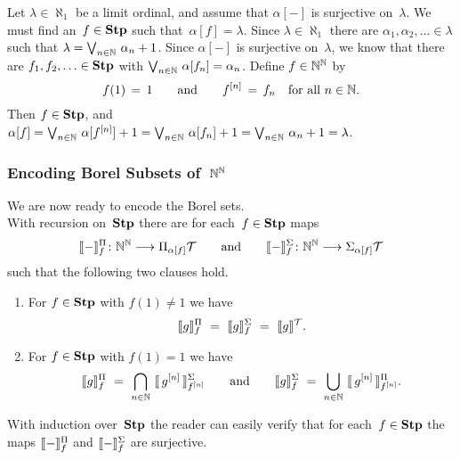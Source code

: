 \documentclass[main.tex]{subfiles}
\begin{document}
Let $\lambda\in\aleph_1$
be a limit ordinal,
and assume that $\alpha[-]$ is surjective on~$\lambda$.
We must find an~$f\in \mathbf{Stp}$ such that~$\alpha[f]=\lambda$.
Since $\lambda\in\aleph_1$
there are  $\alpha_1 ,\alpha_2 ,\dotsc \in \lambda$
such that $\lambda = \bv_{n\in\N}\ \alpha_n+1$.
Since $\alpha[-]$
is surjective on~$\lambda$,
we know that there are  $f_1,f_2,\dotsc \in \mathbf{Stp}$
with $\bv_{n\in\N} \ \alpha[f_n] = \alpha_n$.
Define $f\in\mathbb{N}^{\mathbb{N}}$ by 
\begin{equation*}
f(1)\,=\,1\qquad\text{and}\qquad
f^{[n]} \,=\, f_n\quad\text{for all $n\in\mathbb{N}$}.
\end{equation*}
Then $f\in\mathbf{Stp}$,
and $\alpha[f] = \textstyle{\bigvee}_{n\in\mathbb{N}}\  \alpha[f^{[n]}]+1 
= \textstyle{\bigvee}_{n\in\mathbb{N}}\ \alpha[f_n]+1
= \textstyle{\bigvee}_{n\in\mathbb{N}}\ \alpha_n +1 = \lambda$.

\subsubsection{Encoding Borel Subsets of~$\mathbb{N}^{\mathbb{N}}$}$\,$\\
We are now ready to encode the Borel sets.\\
With recursion on~$\mathbf{Stp}$
there are for each~$f\in\mathbf{Stp}$
maps
\begin{equation*}
\decode{-}^\Pi_f \colon \N^\N \longrightarrow \Pi_{\alpha[f]}\mathcal{T}
\qquad
\text{and}
\qquad
\decode{-}^\Sigma_f \colon \N^\N 
\longrightarrow \Sigma_{\alpha[f]}\mathcal{T}
\end{equation*}
such that the following two clauses hold.
\begin{enumerate}
\item
For $f\in \mathbf{Stp}$ with $f(1)\neq 1$ we have
\begin{equation*}
\decode{g}^\Pi_f \ =\  \decode{g}^\Sigma_f \ =\  \decode{g}^\mathcal{T}.
\end{equation*}

\item
For $f\in \mathbf{Stp}$ with $f(1)= 1$
we have
\begin{equation*}
\decode{g}^\Pi_f \ =\ 
\bigcap_{n\in\N}\ \decode{\,g^{[n]}\,}^\Sigma_{f^{[n]}}
\qquad\text{and}\qquad
\decode{g}^\Sigma_f \ =\ 
{\bigcup_{n\in\N}}\ \decode{\,g^{[n]}\,}^\Pi_{f^{[n]}}.
\end{equation*}
\end{enumerate}
With induction over~$\mathbf{Stp}$
the reader can easily verify
that
for each~$f\in\mathbf{Stp}$
the maps
$\decode{-}^\Pi_f$
and 
$\decode{-}^\Sigma_f$
are surjective.
\end{document}
